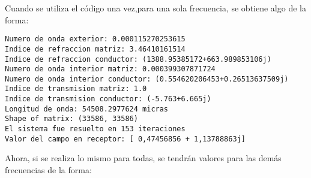 \documentclass[12pt,letterpaper]{report}
\numberwithin{equation}{section}
\begin{document}
Cuando se utiliza el código una vez,para una sola frecuencia, se obtiene algo de la forma:

\begin{lstlisting}
Numero de onda exterior: 0.000115270253615
Indice de refraccion matriz: 3.46410161514
Indice de refraccion conductor: (1388.95385172+663.989853106j)
Numero de onda interior matriz: 0.000399307871724
Numero de onda interior conductor: (0.554620206453+0.26513637509j)
Indice de transmision matriz: 1.0
Indice de transmision conductor: (-5.763+6.665j)
Longitud de onda: 54508.2977624 micras
Shape of matrix: (33586, 33586)
El sistema fue resuelto en 153 iteraciones
Valor del campo en receptor: [ 0,47456856 + 1,13788863j]
\end{lstlisting}

Ahora, si se realiza lo mismo para todas, se tendrán valores para las demás frecuencias de la forma:
\end{document}
